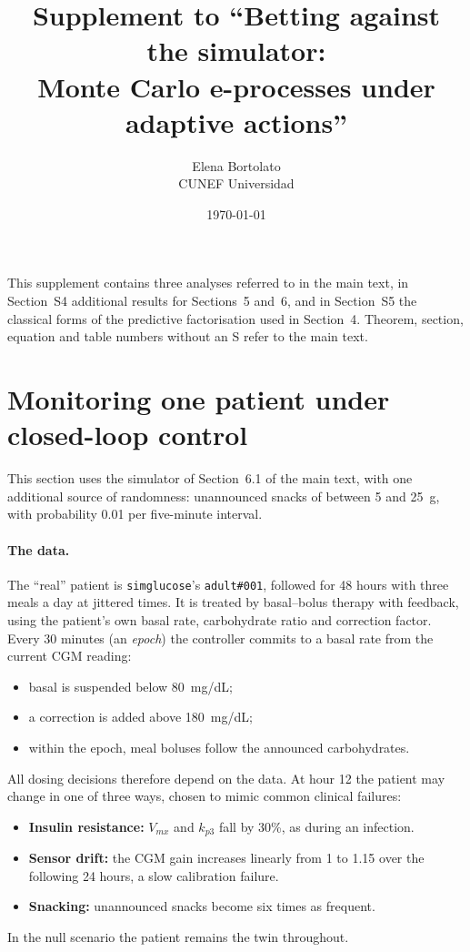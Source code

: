 \documentclass[11pt]{article}
\title{Supplement to ``Betting against the simulator:\\
Monte Carlo e-processes under adaptive actions''}
\author{Elena Bortolato\\ CUNEF Universidad}
\date{\today}
\theoremstyle{remark}
\begin{document}
\maketitle

This supplement contains three analyses referred to in the main text, in
Section~S4 additional results for Sections~5 and~6, and in Section~S5 the
classical forms of the predictive factorisation used in Section~4. Theorem,
section, equation and table numbers without an S refer to the main text.

\section{Monitoring one patient under closed-loop control}\label{sec:t1d-patient}

This section uses the simulator of Section~6.1 of the main
text, with one additional source of randomness: unannounced snacks of between
5 and 25~g, with probability 0.01 per five-minute interval.

\paragraph{The data.} The ``real'' patient is \texttt{simglucose}'s
\texttt{adult\#001}, followed for 48 hours with three meals a day at jittered
times. It is treated by basal--bolus therapy with feedback, using the
patient's own basal rate, carbohydrate ratio and correction factor. Every 30
minutes (an \emph{epoch}) the controller commits to a basal rate from the
current CGM reading:
\begin{itemize}
  \item basal is suspended below 80~mg/dL;
  \item a correction is added above 180~mg/dL;
  \item within the epoch, meal boluses follow the announced carbohydrates.
\end{itemize}
All dosing decisions therefore depend on the data. At hour 12 the patient may
change in one of three ways, chosen to mimic common clinical failures:
\begin{itemize}
  \item \textbf{Insulin resistance:} $V_{mx}$ and $k_{p3}$ fall by 30\%, as
        during an infection.
  \item \textbf{Sensor drift:} the CGM gain increases linearly from 1 to 1.15
        over the following 24 hours, a slow calibration failure.
  \item \textbf{Snacking:} unannounced snacks become six times as frequent.
\end{itemize}
In the null scenario the patient remains the twin throughout.
\end{document}
